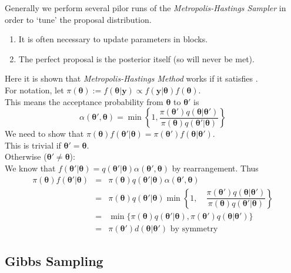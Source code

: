\documentclass[11pt,a4paper]{article}
\begin{document}
Generally we perform several pilor runs of the \textit{Metropolis-Hastings Sampler} in order to `tune' the proposal distribution.
\begin{enumerate}
	\item It is often necessary to update parameters in blocks.
	\item The perfect proposal is the posterior itself (so will never be met).
\end{enumerate}

Here it is shown that \textit{Metropolis-Hastings Method} works if it satisfies .\\
For notation, let $\pi(\pmb\theta):=f(\pmb\theta|\mathbf{y})\propto f(\textbf{y}|\pmb\theta)f(\pmb\theta)$.\\
This means the acceptance probability from $\pmb\theta$ to $\pmb\theta'$ is
$$\alpha(\pmb\theta',\pmb\theta)=\min\left\{1,\dfrac{\pi(\pmb\theta')q(\pmb\theta|\pmb\theta')}{\pi(\pmb\theta)q(\pmb\theta'|\pmb\theta)}\right\}$$
We need to show that $\pi(\pmb\theta)f(\pmb\theta'|\pmb\theta)=\pi(\pmb\theta')f(\pmb\theta|\pmb\theta')$.\\
This is trivial if $\pmb\theta'=\pmb\theta$.\\
Otherwise (\ie $\pmb\theta'\neq\pmb\theta$):\\
We know that $f(\pmb\theta'|\pmb\theta)=q(\pmb\theta'|\pmb\theta)\alpha(\pmb\theta',\pmb\theta)$ by rearrangement. Thus
\[\begin{array}{rcl}
\pi(\pmb\theta)f(\pmb\theta'|\pmb\theta)&=&\pi(\pmb\theta)q(\pmb\theta'|\pmb\theta)\alpha(\pmb\theta',\pmb\theta)\\
&=&\pi(\pmb\theta)q(\pmb\theta'|\pmb\theta)\min\left\{1,\quad\dfrac{\pi(\pmb\theta')q(\pmb\theta|\pmb\theta')}{\pi(\pmb\theta)q(\pmb\theta'|\pmb\theta)}\right\}\\
&=&\min\{\pi(\pmb\theta)q(\pmb\theta'|\pmb\theta),\pi(\pmb\theta')q(\pmb\theta|\pmb\theta')\}\\
&=&\pi(\pmb\theta')d(\pmb\theta|\pmb\theta')\text{ by symmetry}
\end{array}\]
\proved

\subsection{Gibbs Sampling}
\end{document}
